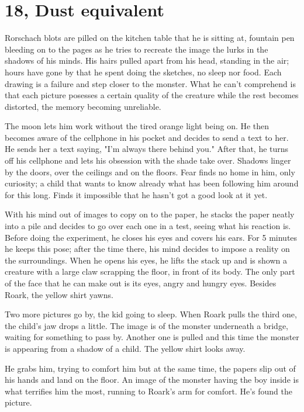\section{18, Dust equivalent}

        Rorschach blots are pilled on the kitchen table that he is sitting at, fountain pen bleeding on to the pages as he tries to recreate the
    image the lurks in the shadows of his minds. His hairs pulled apart from his head, standing in the air; hours have gone by that he spent
    doing the sketches, no sleep nor food. Each drawing is a failure and step closer to the monster. What he can't comprehend is that each
    picture posesses a certain quality of the creature while the rest becomes distorted, the memory becoming unreliable.

        The moon lets him work without the tired orange light being on. He then becomes aware of the cellphone in his pocket and decides to
    send a text to her. He sends her a text saying, "I'm always there behind you." After that, he turns off his cellphone and lets his
    obsession with the shade take over. Shadows linger by the doors, over the ceilings and on the floors. Fear finds no home in him, only
    curiosity; a child that wants to know already what has been following him around for this long. Finds it impossible that he hasn't got a
    good look at it yet.

        With his mind out of images to copy on to the paper, he stacks the paper neatly into a pile and decides to go over each one in a test,
    seeing what his reaction is. Before doing the experiment, he closes his eyes and covers his ears. For 5 minutes he keeps this pose; after
    the time there, his mind decides to impose a reality on the surroundings. When he opens his eyes, he lifts the stack up and is shown a 
    creature with a large claw scrapping the floor, in front of its body. The only part of the face that he can make out is its eyes, angry
    and hungry eyes. Besides Roark, the yellow shirt yawns.

        Two more pictures go by, the kid going to sleep. When Roark pulls the third one, the child's jaw drops a little. The image is of the 
    monster underneath a bridge, waiting for something to pass by. Another one is pulled and this time the monster is appearing from a shadow
    of a child. The yellow shirt looks away.

        He grabs him, trying to comfort him but at the same time, the papers slip out of his hands and land on the floor. An image of the monster
    having the boy inside is what terrifies him the most, running to Roark's arm for comfort. He's found the picture.

